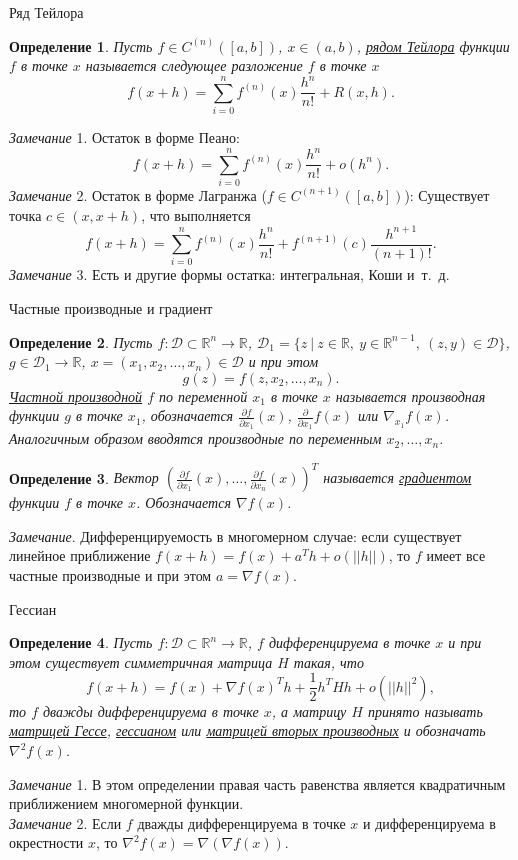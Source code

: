 \documentclass[10pt, handout]{beamer}
\newtheorem{definition_ru}{Определение}[]
\begin{document}
\begin{frame}{Ряд Тейлора}
\begin{definition_ru}
Пусть $f\in C^{(n)}([a,b])$, $x\in (a, b)$, \underline{рядом Тейлора} функции $f$ в точке $x$ называется следующее разложение $f$ в точке $x$
$$
f(x+h)=\sum_{i=0}^nf^{(n)}(x)\frac{h^n}{n!}+R(x, h).
$$
\end{definition_ru}
\pause
\textit{Замечание} 1. Остаток в форме Пеано:
$$
f(x+h)=\sum_{i=0}^nf^{(n)}(x)\frac{h^n}{n!}+o(h^n).
$$
\pause
\textit{Замечание} 2. Остаток в форме Лагранжа ($f\in C^{(n+1)}([a, b])$): Существует точка $c\in (x, x+h)$, что выполняется
$$
f(x+h)=\sum_{i=0}^nf^{(n)}(x)\frac{h^n}{n!}+f^{(n+1)}(c)\frac{h^{n+1}}{(n+1)!}.
$$
\textit{Замечание} 3. Есть и другие формы остатка: интегральная, Коши и~т.~д.
\end{frame}

\begin{frame}{Частные производные и градиент}
\begin{definition_ru}
Пусть $f:\mathcal{D}\subset\mathbb{R}^n\rightarrow \mathbb{R}$, $\mathcal{D}_1=\{z~|~z\in \mathbb{R},~y\in \mathbb{R}^{n-1},~(z,y)\in \mathcal{D}\}$, $g\in \mathcal{D}_1\rightarrow \mathbb{R}$, $x=(x_1, x_2, \ldots, x_n)\in \mathcal{D}$ и при этом
$$
g(z)=f(z, x_2, \ldots, x_n).
$$
\underline{Частной производной} $f$ по переменной $x_1$ в точке $x$ называется производная функции $g$ в точке $x_1$, обозначается $\frac{\partial f}{\partial x_1}(x)$, $\frac{\partial}{\partial x_1}f(x)$ или $\nabla_{x_1}f(x)$. Аналогичным образом вводятся производные по переменным $x_2, \ldots, x_n$.
\end{definition_ru}
\pause
\begin{definition_ru}
Вектор $\left(\frac{\partial f}{\partial x_1}(x),\ldots, \frac{\partial f}{\partial x_n}(x)\right)^T$ называется \underline{градиентом} функции $f$ в точке $x$. Обозначается $\nabla f(x)$.
\end{definition_ru}
\pause
\textit{Замечание}. Дифференцируемость в многомерном случае: если существует линейное приближение $f(x+h)=f(x)+a^Th+o(||h||)$, то $f$ имеет все частные производные и при этом $a=\nabla f(x)$.
\end{frame}

\begin{frame}{Гессиан}
\begin{definition_ru}
Пусть $f:\mathcal{D}\subset\mathbb{R}^n\rightarrow\mathbb{R}$, $f$ дифференцируема в точке $x$ и при этом существует симметричная матрица $H$ такая, что
$$
f(x+h)=f(x)+\nabla f(x)^Th+\frac{1}{2}h^THh+o(||h||^2),
$$
то $f$ дважды дифференцируема в точке $x$, а матрицу $H$ принято называть \underline{матрицей Гессе}, \underline{гессианом} или \underline{матрицей вторых производных} и обозначать $\nabla^2f(x)$.
\end{definition_ru}
\pause
\textit{Замечание} 1. В этом определении правая часть равенства является квадратичным приближением многомерной функции.\\
\pause
\textit{Замечание} 2. Если $f$ дважды дифференцируема в  точке $x$ и дифференцируема в окрестности $x$, то $\nabla^2f(x)=\nabla(\nabla f(x))$.
\end{frame}
\end{document}
